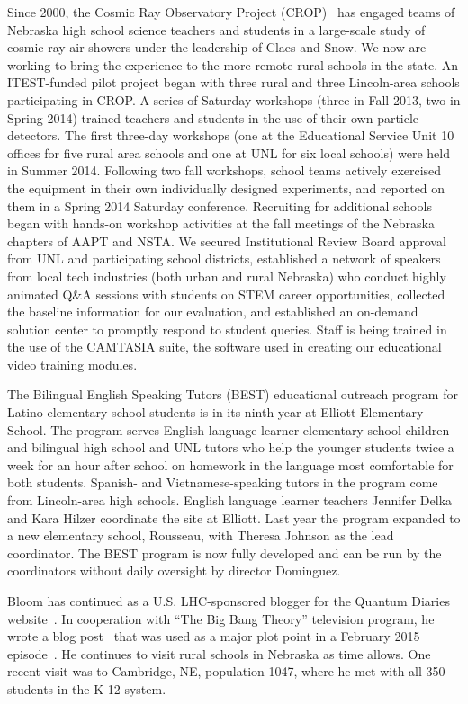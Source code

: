 Since 2000, the Cosmic Ray Observatory Project (CROP)~\cite{bib:cropweb} has engaged teams of Nebraska high school science teachers and students in a large-scale study of cosmic ray air showers under the leadership of Claes and Snow. We now are working to bring the experience to the more remote rural schools in the state.  An ITEST-funded pilot project began with three rural and three Lincoln-area schools participating in CROP.  A series of Saturday workshops (three in Fall 2013, two in Spring 2014) trained teachers and students in the use of their own particle detectors. The first three-day workshops (one at the Educational Service Unit 10 offices for five rural area schools and one at UNL for six local schools) were held in Summer 2014. Following two fall workshops, school teams actively exercised the equipment in their own individually designed experiments, and reported on them in a Spring 2014 Saturday conference. Recruiting for additional schools began with hands-on workshop activities at the fall meetings of the Nebraska chapters of AAPT and NSTA. We secured Institutional Review Board approval from UNL and participating school districts, established a network of speakers from local tech industries (both urban and rural Nebraska) who conduct highly animated Q\&A sessions with students on STEM career opportunities, collected the baseline information for our evaluation, and established an on-demand solution center to promptly respond to student queries. Staff is being trained in the use of the CAMTASIA suite, the software used in creating our educational video training modules.

The Bilingual English Speaking Tutors (BEST) educational outreach program for Latino elementary school students is in its ninth year at Elliott Elementary School.  The program serves English language learner elementary school children and bilingual high school and UNL tutors who help the younger students twice a week for an hour after school on homework in the language most comfortable for both students.  Spanish- and Vietnamese-speaking tutors in the program come from Lincoln-area high schools.  English language learner teachers Jennifer Delka and Kara Hilzer coordinate the site at Elliott.  Last year the program expanded to a new elementary school, Rousseau, with Theresa Johnson as the lead coordinator. The BEST program is now fully developed and can be run by the coordinators without daily oversight by director Dominguez.

Bloom has continued as a U.S. LHC-sponsored blogger for the Quantum Diaries website~\cite{bib:bloomblog}.  In cooperation with ``The Big Bang Theory'' television program, he wrote a blog post~\cite{bib:TBBTQD} that was used as a major plot point in a February 2015 episode~\cite{bib:TBBTepisode}.  He continues to visit rural schools in Nebraska as time allows.  One recent visit was to Cambridge, NE, population 1047, where he met with all 350 students in the K-12 system.

